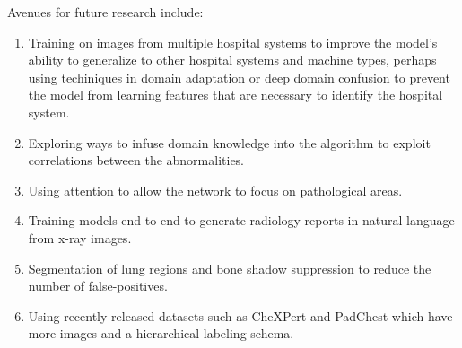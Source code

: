 \documentclass[12pt,oneside,a4paper]{report}
\begin{document}
Avenues for future research include:
\begin{enumerate}
\item{Training on images from multiple hospital systems to improve the model's
    ability to generalize to other hospital systems and machine types, perhaps
    using techiniques in domain adaptation or deep domain confusion
    \cite{tzeng2014deep} to prevent the model from learning features that are
    necessary to identify the hospital system. }
\item{Exploring ways to infuse domain knowledge into the algorithm to exploit
    correlations between the abnormalities.}
\item{Using attention to allow the network to focus on pathological areas.}
\item{Training models end-to-end to generate radiology reports in natural
    language from x-ray images.}
\item{Segmentation of lung regions and bone shadow suppression to reduce the
    number of false-positives.}
\item{Using recently released datasets such as CheXPert\cite{Irvin2019} and
    PadChest\cite{Bustos2019} which have more images and a hierarchical labeling
    schema.}
\end{enumerate}
\printbibliography
\end{document}
